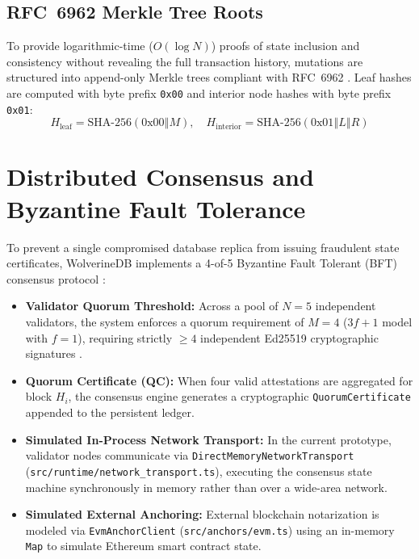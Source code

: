 \subsection{RFC~6962 Merkle Tree Roots}
To provide logarithmic-time ($O(\log N)$) proofs of state inclusion and consistency without revealing the full transaction history, mutations are structured into append-only Merkle trees compliant with RFC~6962 \cite{rfc6962, merkle1987digital}. Leaf hashes are computed with byte prefix \texttt{0x00} and interior node hashes with byte prefix \texttt{0x01}:
\begin{equation}
\label{eq:merkle_prefixes}
H_{\text{leaf}} = \text{SHA-256}(0\text{x}00 \mathbin{\Vert} M), \quad H_{\text{interior}} = \text{SHA-256}(0\text{x}01 \mathbin{\Vert} L \mathbin{\Vert} R)
\end{equation}

\section{Distributed Consensus and Byzantine Fault Tolerance}
\label{sec:consensus_model}

To prevent a single compromised database replica from issuing fraudulent state certificates, WolverineDB implements a 4-of-5 Byzantine Fault Tolerant (BFT) consensus protocol \cite{castro1999practical, lamport1982byzantine}:

\begin{itemize}
    \item \textbf{Validator Quorum Threshold:} Across a pool of $N = 5$ independent validators, the system enforces a quorum requirement of $M = 4$ ($3f + 1$ model with $f=1$), requiring strictly $\ge 4$ independent Ed25519 cryptographic signatures \cite{rfc8032}.
    \item \textbf{Quorum Certificate (QC):} When four valid attestations are aggregated for block $H_i$, the consensus engine generates a cryptographic \texttt{QuorumCertificate} appended to the persistent ledger.
    \item \textbf{Simulated In-Process Network Transport:} In the current prototype, validator nodes communicate via \texttt{DirectMemoryNetworkTransport} (\texttt{src/runtime/network\_transport.ts}), executing the consensus state machine synchronously in memory rather than over a wide-area network.
    \item \textbf{Simulated External Anchoring:} External blockchain notarization is modeled via \texttt{EvmAnchorClient} (\texttt{src/anchors/evm.ts}) using an in-memory \texttt{Map} to simulate Ethereum smart contract state.
\end{itemize}

